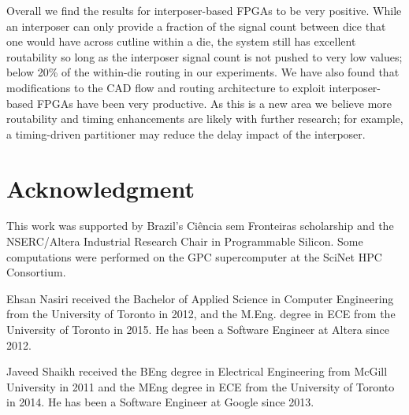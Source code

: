 \documentclass[journal]{IEEEtran}
\begin{document}
Overall we find the results for interposer-based FPGAs to be very positive. While an interposer can only provide a fraction of the signal count between dice that one would have across cutline within a die, the system still has excellent routability so long as the interposer signal count is not pushed to very low values; below 20\% of the within-die routing in our experiments. We have also found that modifications to the CAD flow and routing architecture to exploit interposer-based FPGAs have been very productive. As this is a new area we believe more routability and timing enhancements are likely with further research; for example, a timing-driven partitioner may reduce the delay impact of the interposer.

\section*{Acknowledgment}
This work was supported by Brazil's Ci\^{e}ncia sem Fronteiras scholarship and the NSERC/Altera Industrial Research Chair in Programmable Silicon. Some computations were performed on the GPC supercomputer at the SciNet HPC Consortium.




\vfill
\begin{IEEEbiography}{Ehsan Nasiri} received the Bachelor of Applied Science in Computer Engineering from the University of Toronto in 2012, and the M.Eng. degree in ECE from the University of Toronto in 2015. He has been a Software Engineer at Altera since 2012.
\end{IEEEbiography}

\begin{IEEEbiography}{Javeed Shaikh} received the BEng degree in Electrical Engineering from McGill University in 2011 and the MEng degree in ECE from the University of Toronto in 2014. He has been a Software Engineer at Google since 2013.
\end{IEEEbiography}
\end{document}
